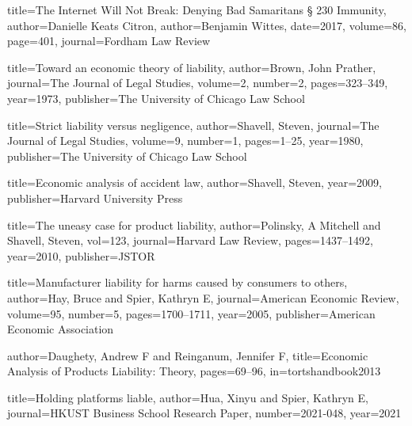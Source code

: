 
{
title={The Internet Will Not Break: Denying Bad Samaritans § 230 Immunity},
author={Danielle Keats Citron},
author={Benjamin Wittes},
date={2017},
volume=86,
page=401,
journal=Fordham Law Review
}




{
  title={Toward an economic theory of liability},
  author={Brown, John Prather},
  journal={The Journal of Legal Studies},
  volume={2},
  number={2},
  pages={323--349},
  year={1973},
  publisher={The University of Chicago Law School}
}

{
  title={Strict liability versus negligence},
  author={Shavell, Steven},
  journal={The Journal of Legal Studies},
  volume={9},
  number={1},
  pages={1--25},
  year={1980},
  publisher={The University of Chicago Law School}
}

{
  title={Economic analysis of accident law},
  author={Shavell, Steven},
  year={2009},
  publisher={Harvard University Press}
}


{
  title={The uneasy case for product liability},
  author={Polinsky, A Mitchell and Shavell, Steven},
  vol={123},
  journal={Harvard Law Review},
  pages={1437--1492},
  year={2010},
  publisher={JSTOR}
}

{
  title={Manufacturer liability for harms caused by consumers to others},
  author={Hay, Bruce and Spier, Kathryn E},
  journal={American Economic Review},
  volume={95},
  number={5},
  pages={1700--1711},
  year={2005},
  publisher={American Economic Association}
}


{
  author={Daughety, Andrew F and Reinganum, Jennifer F},
  title={Economic Analysis of Products Liability: Theory},
  pages={69--96},
  in={tortshandbook2013}
}


{
  title={Holding platforms liable},
  author={Hua, Xinyu and Spier, Kathryn E},
  journal={HKUST Business School Research Paper},
  number={2021-048},
  year={2021}
}

